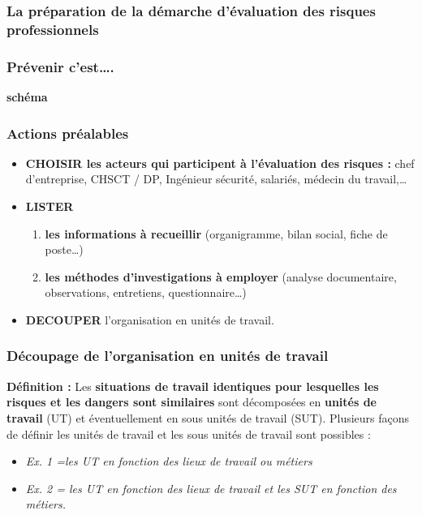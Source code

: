 \documentclass{beamer}
\begin{document}
\begin{frame}
\frametitle{La préparation de la démarche d’évaluation des risques professionnels}
\end{frame}

\begin{frame}
\frametitle{Prévenir c’est….}
\textbf{schéma}
\end{frame}

\begin{frame}
\frametitle{Actions préalables}
\begin{itemize}
\item \textbf{CHOISIR les acteurs qui participent à l’évaluation des risques :} 
chef d’entreprise, CHSCT / DP, Ingénieur sécurité, salariés, médecin du travail,…
\item \textbf{LISTER}
\begin{enumerate}
\item  \textbf{les informations à recueillir} (organigramme, bilan social, fiche de poste…) 
\item  \textbf{les méthodes d’investigations à employer} (analyse documentaire, observations, entretiens, questionnaire…)
\end{enumerate}
\item \textbf{DECOUPER} l’organisation en unités de travail.
\end{itemize}
\end{frame}

\begin{frame}
\frametitle{Découpage de l’organisation en unités de travail}
\textbf{Définition : }
Les \textbf{situations de travail identiques pour lesquelles les risques et les dangers sont similaires} sont décomposées en \textbf{unités de travail} (UT) et éventuellement en sous unités de travail (SUT).
Plusieurs façons de définir les unités de travail et les sous unités de travail sont possibles :
\begin{itemize}
\item \textit{Ex. 1 =les UT en fonction des lieux de travail ou métiers}
\item \textit{Ex. 2 = les UT en fonction des lieux de travail et les SUT en  fonction des métiers.}
\end{itemize}
\end{frame}
\end{document}
